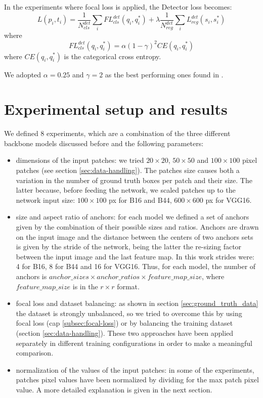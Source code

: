 \documentclass[a4paper,10pt]{report}
\begin{document}
In the experiments where focal loss is applied, the Detector loss becomes:
\[L({p_i}, {t_i}) = \dfrac{1}{N_{cls}^{det}} \sum_{i} FL_{cls}^{det}(q_i, q_i^*) + \lambda \dfrac{1}{N_{reg}^{det}} \sum_{i}L_{reg}^{det}(s_i, s_i^*) \]
where
\[FL_{cls}^{det}(q_i, q_i^*) = \alpha (1-\gamma)^2 CE(q_i, q_i^*)\]
where $CE(q_i, q_i^*)$ is the categorical cross entropy. 

We adopted $\alpha=0.25$ and $\gamma=2$ as the best performing ones found in \cite{focal-loss}.

\chapter{Experimental setup and results}\label{chap:experiments}
 We defined 8 experiments, which are a combination of the three different backbone models discussed before and the following parameters:

\begin{itemize}
    \item dimensions of the input patches: we tried $20 \times 20$, $50 \times 50$ and $100 \times 100$ pixel patches (see section \ref{sec:data-handling}). The patches size causes both a variation in the number of ground truth boxes per patch and their size. The latter because, before feeding the network, we scaled patches up to the network input size: $100 \times 100 $ px for B16 and B44, $ 600 \times 600$ px for VGG16.
    \item size and aspect ratio of anchors: for each model we defined a set of anchors given by the combination of their possible sizes and ratios. Anchors are drawn on the input image and the distance between the centers of two anchors sets is given by the stride of the network, being the latter the re-sizing factor between the input image and the last feature map. In this work strides were: 4 for B16, 8 for B44 and 16 for VGG16. Thus, for each model, the number of anchors is $anchor\_sizes \times anchor\_ratios \times feature\_map\_size$, where $feature\_map\_size$ is in the $r \times r$ format.
    \item focal loss and dataset balancing: as shown in section \ref{sec:ground_truth_data} the dataset is strongly unbalanced, so we tried to overcome this by using focal loss (cap \ref{subsec:focal-loss}) or by balancing the training dataset (section \ref{sec:data-handling}). These two approaches have been applied separately in different training configurations in order to make a meaningful comparison.  
    \item normalization of the values of the input patches: in some of the experiments, patches pixel values have been normalized by dividing for the max patch pixel value. A more detailed explanation is given in the next section.
\end{itemize}
\end{document}
